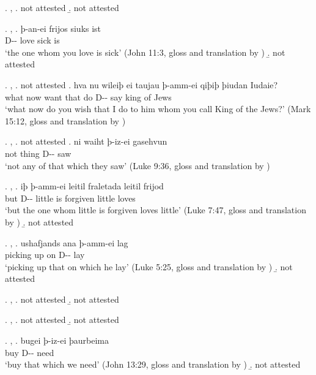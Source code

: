 \ex. , 
\a.  not attested
\b.  not attested

\ex. , 
\ag. þ-an-ei frijos siuks ist\\
 D-- love\scsub{[acc]} sick is\scsub{[nom]}\\
 `the one whom you love is sick' \hfill (John 11:3, gloss and translation by \citealt[342]{harbert1978})
\b.  not attested

\ex. , 
\a.  not attested
\bg. hva nu wileiþ ei taujau þ-amm-ei qiþiþ þiudan Iudaie?\\
 what now want that do\scsub{[dat]} D-- say\scsub{[acc]} king {of Jews}\\
 `what now do you wish that I do to him whom you call King of the Jews?' \hfill (Mark 15:12, gloss and translation by \citealt[339]{harbert1978})

\ex. , 
\a.  not attested
\bg. ni waiht þ-iz-ei gasehvun\\
 not thing\scsub{[gen]} D-- saw\scsub{[acc]}\\
 `not any of that which they saw' \hfill (Luke 9:36, gloss and translation by \citealt[340]{harbert1978})

\ex. , 
\ag. iþ þ-amm-ei leitil fraletada leitil frijod\\
 but D-- little {is forgiven\scsub{[dat]}} little loves\scsub{[nom]}\\
 `but the one whom little is forgiven loves little' \hfill (Luke 7:47, gloss and translation by \citealt[342]{harbert1978})
\b.  not attested

\ex. , 
\ag. ushafjands ana þ-amm-ei lag\\
 picking up on\scsub{[acc]} D-- lay\scsub{[dat]}\\
 `picking up that on which he lay' \hfill (Luke 5:25, gloss and translation by \citealt[343]{harbert1978})
\b.  not attested

\ex. , 
\a.  not attested
\b.  not attested

\ex.  , 
\a.  not attested
\b.  not attested

\ex. , 
\ag. bugei þ-iz-ei þaurbeima\\
 buy\scsub{[acc]} D-- need\scsub{[gen]}\\
 `buy that which we need' \hfill (John 13:29, gloss and translation by \citealt[343]{harbert1978})
\b.  not attested

